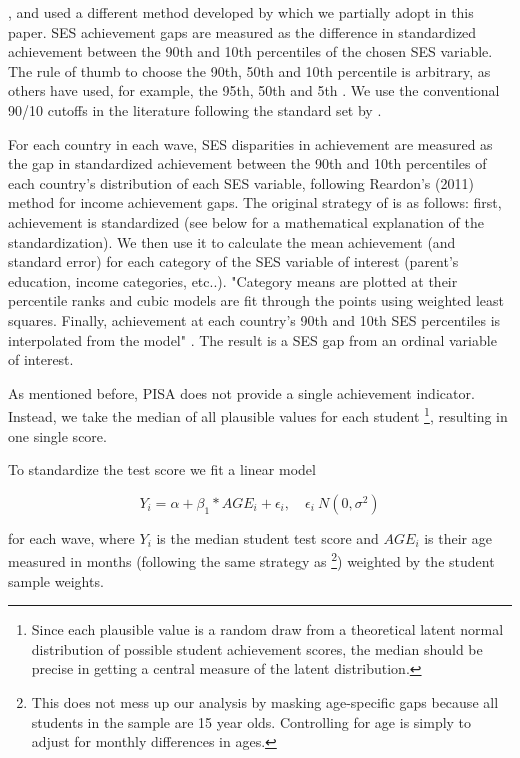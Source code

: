 \documentclass[11pt, a4paper]{article}\usepackage[]{graphicx}\usepackage[]{color}
\begin{document}
\citet{reardon_portilla}, \citet{anna2016} and \citet{anna2016_global} used a different method developed by \citet{reardon2011} which we partially adopt in this paper. SES achievement gaps are measured as the difference in standardized achievement between the 90th and 10th percentiles of the chosen SES variable. The rule of thumb to choose the 90th, 50th and 10th percentile is arbitrary, as others have used, for example, the 95th, 50th and 5th \citep{micklewright}. We use the conventional 90/10 cutoffs in the literature following the standard set by \citet{reardon2011}.

For each country in each wave, SES disparities in achievement are measured as the gap in standardized achievement between the 90th and 10th percentiles of each country’s distribution of each SES variable, following Reardon’s (2011) method for income achievement gaps. The original strategy of \citet{reardon2011} is as follows: first, achievement is standardized (see below for a mathematical explanation of the standardization). We then use it to calculate the mean achievement (and standard error) for each category of the SES variable of interest (parent's education, income categories, etc..). "Category means are plotted at their percentile ranks and cubic models are fit through the points using weighted least squares. Finally, achievement at each country’s 90th and 10th SES percentiles is interpolated from the model" \citep{anna2016_global}. The result is a SES gap from an ordinal variable of interest.

As mentioned before, PISA does not provide a single achievement indicator. Instead, we take the median of all plausible values for each student \footnote{Since each plausible value is a random draw from a theoretical latent normal distribution of possible student achievement scores, the median should be precise in getting a central measure of the latent distribution.}, resulting in one single score.

To standardize the test score we fit a linear model

\begin{equation}
Y_i = \alpha + \beta_1 * AGE_i + \epsilon_i, \quad \epsilon_i ~ N(0, \sigma^2)
\end{equation}

for each wave, where \begin{math}Y_i\end{math} is the median student test score and \begin{math}AGE_i\end{math} is their age measured in months (following the same strategy as \citet{reardon2011} \footnote{This does not mess up our analysis by masking age-specific gaps because all students in the sample are 15 year olds. Controlling for age is simply to adjust for monthly differences in ages.}) weighted by the student sample weights.
\end{document}
